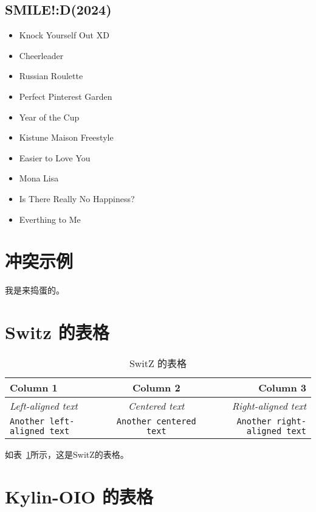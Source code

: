 \documentclass{article}
\begin{document}
\subsection{SMILE!:D(2024)}

\begin{itemize}
    \item Knock Yourself Out XD
    \item Cheerleader
    \item Russian Roulette
    \item Perfect Pinterest Garden
    \item Year of the Cup
    \item Kistune Maison Freestyle
    \item Easier to Love You
    \item Mona Lisa
    \item Is There Really No Happiness?
    \item Everthing to Me
\end{itemize}

\section{冲突示例}

我是来捣蛋的。

\section{ Switz 的表格}

\begin{table}[h]
    \centering
    \begin{tabular}{lcr}
        \toprule
        \textbf{Column 1}                  & \textbf{Column 2}              & \textbf{Column 3}                   \\
        \midrule
        \textit{Left-aligned text}         & \textit{Centered text}         & \textit{Right-aligned text}         \\
        \texttt{Another left-aligned text} & \texttt{Another centered text} & \texttt{Another right-aligned text} \\
        \bottomrule
    \end{tabular}
    \caption{SwitZ 的表格}
    \label{tab:switz}
\end{table}

如表~\ref{tab:switz}所示，这是SwitZ的表格。

\section{ Kylin-OIO 的表格}
\end{document}
